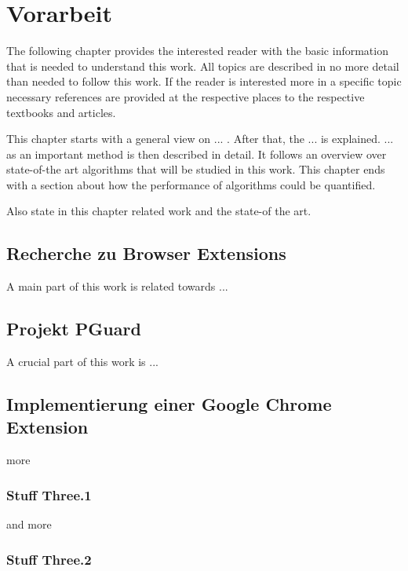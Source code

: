 \chapter{Vorarbeit}
\label{c:preliminaries}

The following chapter provides the interested reader with the basic information that is needed to understand this work. All topics are described in no more detail than needed to follow this work. If the reader is interested more in a specific topic necessary references are provided at the respective places to the respective textbooks and articles.

This chapter starts with a general view on ... . After that, the ... is explained. ... as an important method is then described in detail. It follows an overview over state-of-the art algorithms that will be studied in this work. This chapter ends with a section about how the performance of algorithms could be quantified.

Also state in this chapter related work and the state-of the art.

\section{Recherche zu Browser Extensions}
\label{s:stuff1}

A main part of this work is related towards ...


\section{Projekt PGuard}
\label{s:stuff2}

A crucial part of this work is ...



\section{Implementierung einer Google Chrome Extension}
\label{s:Stuff 3}

more

\subsection{Stuff Three.1}
\label{ss:stuff31}

and more

\subsection{Stuff Three.2}
\label{ss:stuff3.2}

